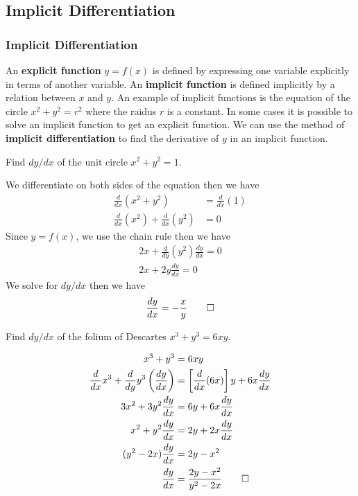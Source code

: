 \subsection{Implicit Differentiation}
\subsubsection{Implicit Differentiation}
An \textbf{explicit function} \(y=f(x)\) is defined by expressing one variable
explicitly in terms of another variable.
An \textbf{implicit function} is defined implicitly by a relation between
\(x\) and \(y\).
An example of implicit functions is the equation of the circle \(x^2+y^2=r^2\)
where the raidus \(r\) is a constant.
In some cases it is possible to solve an implicit function to get an explicit function.
We can use the method of \textbf{implicit differentiation} to find the derivative
of \(y\) in an implicit function.
\begin{problem}
    Find \(dy/dx\) of the unit circle \(x^2+y^2=1\).
\end{problem}
\begin{solution}
    We differentiate on both sides of the equation then we have
    \begin{align*}
        \frac{d}{dx}(x^2+y^2)&=\frac{d}{dx}(1)\\
        \frac{d}{dx}(x^2)+\frac{d}{dx}(y^2)&=0
    \end{align*}
    Since \(y=f(x)\), we use the chain rule then we have
    \begin{align*}
        2x+\frac{d}{dy}(y^2)\frac{dy}{dx}=0\\
        2x+2y\frac{dy}{dx}=0
    \end{align*}
    We solve for \(dy/dx\) then we have
    \[\frac{dy}{dx}=-\frac{x}{y}\qedhere\]
\end{solution}
\begin{problem}
    Find \(dy/dx\) of the folium of Descartes \(x^3+y^3=6xy\).
\end{problem}
\begin{solution}
    \begin{align*}
        x^3+y^3&=6xy\\\frac{d}{dx}x^3+\frac{d}{dy}y^3\left(\frac{dy}{dx}\right)
        &=\left[\frac{d}{dx}(6x)\right]y+6x\frac{dy}{dx}\\3x^2+3y^2\frac{dy}{dx}
        &=6y+6x\frac{dy}{dx}\\x^2+y^2\frac{dy}{dx}&=2y+2x\frac{dy}{dx}
        \\(y^2-2x)\frac{dy}{dx}&=2y-x^2\\\frac{dy}{dx}&=\frac{2y-x^2}{y^2-2x}\qedhere
    \end{align*}
\end{solution}